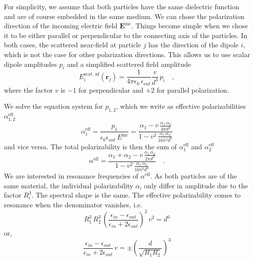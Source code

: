 For simplicity, we assume that both particles have the same dielectric function and are of course embedded in the same medium. 
We  can chose the polarization direction of the incoming electric field  $\mathbf{E}^{\text{inc}}$. Things become simple when we chose it to be either parallel or perpendicular to the connecting axis of the particles. In both cases, the scattered near-field at particle $j$ has the direction of the dipole $i$, which is not the case for other polarization directions. This allows us to use scalar dipole amplitudes $p_i$ and a simplified scattered field amplitude
\begin{equation}
  {E}^{\text{scat, nf}}_i(\mathbf{r}_j) = \frac{ 1 }{4\pi\epsilon_0 \, \epsilon_{out}}  \frac{v}{d^3} \, p_i 
  \quad ,
\end{equation}
where the factor $v$ is $-1$ for perpendicular and $+2$ for parallel polarization.

We solve the equation system for $p_{1,2}$, which we write as effective polarizabilities $\alpha^\text{eff}_{1,2}$
\begin{equation}
 \alpha^\text{eff}_1 = \frac{p_1}{\epsilon_0 \epsilon_{out} \, E^\text{inc}} =  \frac{\alpha_1 - v \, \frac{\alpha_1 \, \alpha_2}{4 \pi d^3}}
 {1- v^2 \, \frac{\alpha_1 \, \alpha_2 }{16 \pi^2 d^6}} 
\end{equation}
and vice versa.
The total polarizability  is then the sum of $\alpha^\text{eff}_{1}$ and $\alpha^\text{eff}_{2}$
\begin{equation}
 \alpha^\text{eff} = \frac{\alpha_1  + \alpha_2 - v \, \frac{\alpha_1 \, \alpha_2}{2 \pi d^3}}
 {1- v^2 \, \frac{\alpha_1 \, \alpha_2 }{16 \pi^2 d^6}} \quad .
 \label{eq:hybrid_alpha_eff}
\end{equation}
We are interested in resonance frequencies of $\alpha^\text{eff} $. As both particles are of the same material, the individual polarizability $\alpha_i$ only differ in amplitude due to the factor $R_i^3$. The spectral shape is the same. The effective polarizability comes to resonance when the denominator vanishes, i.e.
\begin{equation}
R_1^3 \, R_2^3 \, \left( \frac{\epsilon_{in} - \epsilon_{out}} {\epsilon_{in} + 2 \epsilon_{out}} \right)^2 \, v^2 = d^6
\label{eq:hybrid_res_cond}
\end{equation}
or,
\begin{equation}
 \frac{\epsilon_{in} - \epsilon_{out}} {\epsilon_{in} + 2 \epsilon_{out}} \, v = \pm \left( \frac{d}{\sqrt{R_1 R_2}} \right)^3
\end{equation}

